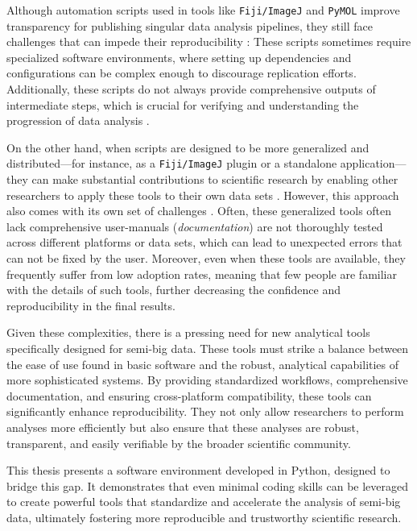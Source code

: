 Although automation scripts used in tools like \texttt{Fiji/ImageJ} and
\texttt{PyMOL} improve transparency for publishing singular data analysis
pipelines, they still face challenges that can impede their reproducibility
\cite{pengReproducibleResearchComputational2011, sandveTenSimpleRules2013}:
These scripts sometimes require specialized software environments, where setting
up dependencies and configurations can be complex enough to discourage
replication efforts. Additionally, these scripts do not always provide
comprehensive outputs of intermediate steps, which is crucial for verifying and
understanding the progression of data analysis \cite{sandveTenSimpleRules2013}.

On the other hand, when scripts are designed to be more generalized and
distributed—for instance, as a \texttt{Fiji/ImageJ} plugin or a standalone
application—they can make substantial contributions to scientific research by
enabling other researchers to apply these tools to their own data sets
\cite{narztReusabilityConceptProcess1998,wilkinsonFAIRGuidingPrinciples2016}. However, this approach also comes
with its own set of challenges \cite{sandveTenSimpleRules2013}. Often, these
generalized tools often lack comprehensive user-manuals (\emph{documentation})
are not thoroughly tested across different platforms or data sets, which can
lead to unexpected errors that can not be fixed by the user. Moreover, even when
these tools are available, they frequently suffer from low adoption rates,
meaning that few people are familiar with the details of such tools, further
decreasing the confidence and reproducibility in the final results.

Given these complexities, there is a pressing need for new analytical tools
specifically designed for semi-big data. These tools must strike a balance
between the ease of use found in basic software and the robust, analytical
capabilities of more sophisticated systems. By providing standardized workflows,
comprehensive documentation, and ensuring cross-platform compatibility, these
tools can significantly enhance reproducibility. They not only allow researchers
to perform analyses more efficiently but also ensure that these analyses are
robust, transparent, and easily verifiable by the broader scientific community.

This thesis presents a software environment developed in Python, designed to
bridge this gap. It demonstrates that even minimal coding skills can be
leveraged to create powerful tools that standardize and accelerate the analysis
of semi-big data, ultimately fostering more reproducible and trustworthy
scientific research.







